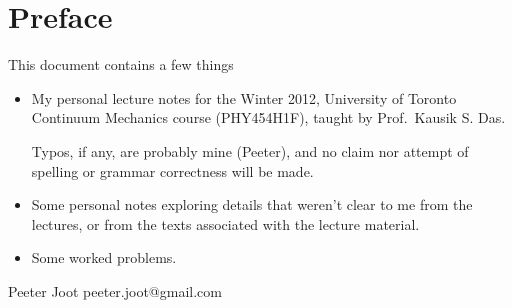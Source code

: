 \chapter*{Preface}\normalsize

This document contains a few things

\begin{itemize}
\item My personal lecture notes for the Winter 2012, University of Toronto Continuum Mechanics course (PHY454H1F), taught by Prof.\ Kausik S. Das.

Typos, if any, are probably mine (Peeter), and no claim nor attempt of spelling or grammar correctness will be made.

\item Some personal notes exploring details that weren't clear to me from the lectures, or from the texts associated with the lecture material.

\item Some worked problems.

\end{itemize}

Peeter Joot  \quad peeter.joot@gmail.com 

